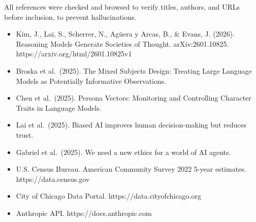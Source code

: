 \documentclass[
  11pt,
]{article}
\providecommand{\tightlist}{%
  \setlength{\itemsep}{0pt}\setlength{\parskip}{0pt}}
\begin{document}
All references were checked and browsed to verify titles, authors, and
URLs before inclusion, to prevent hallucinations.

\begin{itemize}
\tightlist
\item
  Kim, J., Lai, S., Scherrer, N., Agüera y Arcas, B., \& Evans, J.
  (2026). Reasoning Models Generate Societies of Thought.
  arXiv:2601.10825. https://arxiv.org/html/2601.10825v1
\item
  Broska et al.~(2025). The Mixed Subjects Design: Treating Large
  Language Models as Potentially Informative Observations.
\item
  Chen et al.~(2025). Persona Vectors: Monitoring and Controlling
  Character Traits in Language Models.
\item
  Lai et al.~(2025). Biased AI improves human decision-making but
  reduces trust.
\item
  Gabriel et al.~(2025). We need a new ethics for a world of AI agents.
\item
  U.S. Census Bureau. American Community Survey 2022 5-year estimates.
  https://data.census.gov
\item
  City of Chicago Data Portal. https://data.cityofchicago.org
\item
  Anthropic API. https://docs.anthropic.com
\end{itemize}
\end{document}
